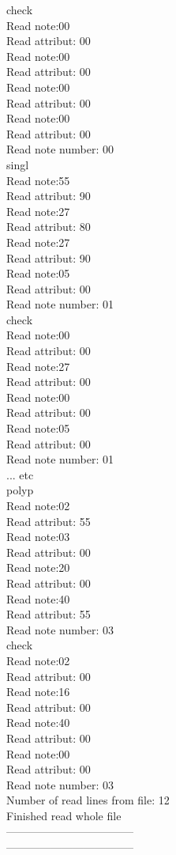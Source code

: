 check\\
Read note:00\\
Read attribut: 00\\
Read note:00\\
Read attribut: 00\\
Read note:00\\
Read attribut: 00\\
Read note:00\\
Read attribut: 00\\
Read note number: 00\\

singl\\
Read note:55\\
Read attribut: 90\\
Read note:27\\
Read attribut: 80\\
Read note:27\\
Read attribut: 90\\
Read note:05\\
Read attribut: 00\\
Read note number: 01\\

check\\
Read note:00\\
Read attribut: 00\\
Read note:27\\
Read attribut: 00\\
Read note:00\\
Read attribut: 00\\
Read note:05\\
Read attribut: 00\\
Read note number: 01\\

... etc \\

polyp\\
Read note:02\\
Read attribut: 55\\
Read note:03\\
Read attribut: 00\\
Read note:20\\
Read attribut: 00\\
Read note:40\\
Read attribut: 55\\
Read note number: 03\\

check\\
Read note:02\\
Read attribut: 00\\
Read note:16\\
Read attribut: 00\\
Read note:40\\
Read attribut: 00\\
Read note:00\\
Read attribut: 00\\
Read note number: 03\\

Number of read lines from file: 12\\
Finished read whole file\\
-----------------------------------\\
-----------------------------------\\
